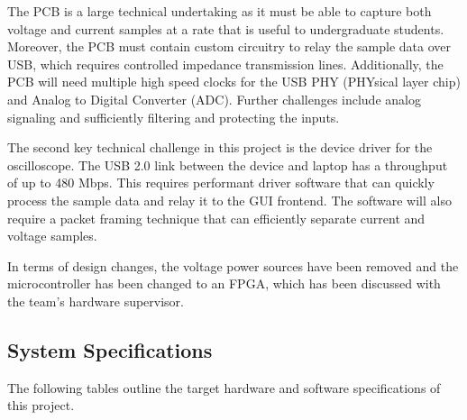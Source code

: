 \documentclass[letterpaper,12pt]{article}
\begin{document}
The PCB is a large technical undertaking as it must be able to capture both
voltage and current samples at a rate that is useful to undergraduate students.
Moreover, the PCB must contain custom circuitry to relay the sample data over
USB, which requires controlled impedance transmission
lines. Additionally, the PCB will need multiple high speed clocks for
the USB PHY (PHYsical layer chip) and Analog to Digital Converter (ADC). Further challenges include
analog signaling and sufficiently filtering and protecting the inputs.

The second key technical challenge in this project is the device driver for the
oscilloscope. The USB 2.0 link between the device and laptop has a throughput of
up to 480 Mbps. This requires performant driver software that can quickly process
the sample data and relay it to the GUI frontend. The software will also require
a packet framing technique that can efficiently separate current and voltage
samples.

In terms of design changes, the voltage power
sources have been removed and the microcontroller has been changed to an FPGA,
which has been discussed with the team's hardware supervisor.
\subsection{System Specifications} \label{sec:specs}
The following tables outline the target hardware and software specifications of
this project.
\end{document}
